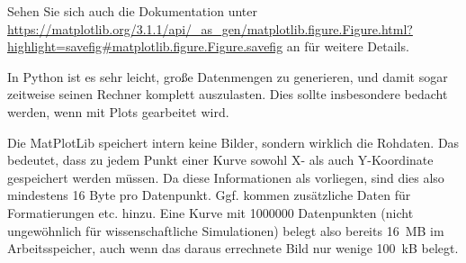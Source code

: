 Sehen Sie sich auch die Dokumentation unter \url{https://matplotlib.org/3.1.1/api/_as_gen/matplotlib.figure.Figure.html?highlight=savefig#matplotlib.figure.Figure.savefig} an für weitere Details.

\begin{hintbox}[Speicherbedarf]
In Python ist es sehr leicht, große Datenmengen zu generieren, und damit sogar zeitweise seinen Rechner komplett auszulasten. Dies sollte insbesondere bedacht werden, wenn mit Plots gearbeitet wird.

Die MatPlotLib speichert intern keine Bilder, sondern wirklich die Rohdaten. Das bedeutet, dass zu jedem Punkt einer Kurve sowohl X- als auch Y-Koordinate gespeichert werden müssen. Da diese Informationen \idR als  vorliegen, sind dies also mindestens 16 Byte pro Datenpunkt. Ggf. kommen zusätzliche Daten für Formatierungen etc. hinzu. Eine Kurve mit \SI{1000000}{} Datenpunkten (nicht ungewöhnlich für wissenschaftliche Simulationen) belegt also bereits \SI{16}{MB} im Arbeitsspeicher, auch wenn das daraus errechnete Bild nur wenige \SI{100}{kB} belegt.
\end{hintbox}
%
